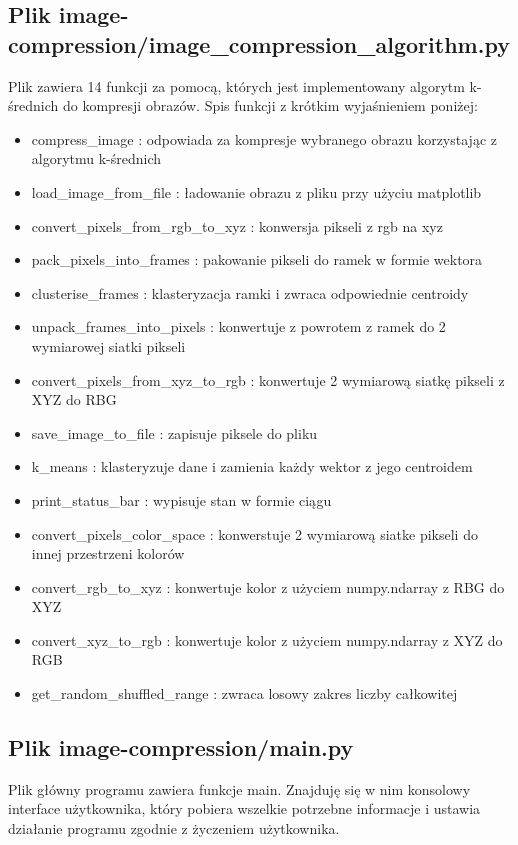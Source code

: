 \documentclass{classrep}
\begin{document}
{        \subsection{Plik image-compression/image\_compression\_algorithm.py}
        {
            Plik zawiera 14 funkcji za pomocą, których jest implementowany algorytm k-średnich do kompresji obrazów.
            Spis funkcji z krótkim wyjaśnieniem poniżej:
            \begin{itemize}
                \item compress\_image : odpowiada za kompresje wybranego obrazu korzystając z algorytmu k-średnich
                \item load\_image\_from\_file : ładowanie obrazu z pliku przy użyciu matplotlib
                \item convert\_pixels\_from\_rgb\_to\_xyz : konwersja pikseli z rgb na xyz
                \item pack\_pixels\_into\_frames : pakowanie pikseli do ramek w formie wektora
                \item clusterise\_frames : klasteryzacja ramki i zwraca odpowiednie centroidy
                \item unpack\_frames\_into\_pixels : konwertuje z powrotem z ramek do 2 wymiarowej siatki pikseli
                \item convert\_pixels\_from\_xyz\_to\_rgb : konwertuje 2 wymiarową siatkę pikseli z XYZ do RBG
                \item save\_image\_to\_file : zapisuje piksele do pliku
                \item k\_means : klasteryzuje dane i zamienia każdy wektor z jego centroidem
                \item print\_status\_bar : wypisuje stan w formie ciągu
                \item convert\_pixels\_color\_space : konwerstuje 2 wymiarową siatke pikseli do innej przestrzeni kolorów
                \item convert\_rgb\_to\_xyz : konwertuje kolor z użyciem numpy.ndarray z RBG do XYZ
                \item convert\_xyz\_to\_rgb : konwertuje kolor z użyciem numpy.ndarray z XYZ do RGB
                \item get\_random\_shuffled\_range : zwraca losowy zakres liczby całkowitej
            \end{itemize}
        }
        \subsection{Plik image-compression/main.py}
        {
            Plik główny programu zawiera funkcje main. Znajduję się w nim konsolowy interface użytkownika,
            który pobiera wszelkie potrzebne informacje i ustawia działanie programu zgodnie z życzeniem użytkownika.
        }
    }
\end{document}
